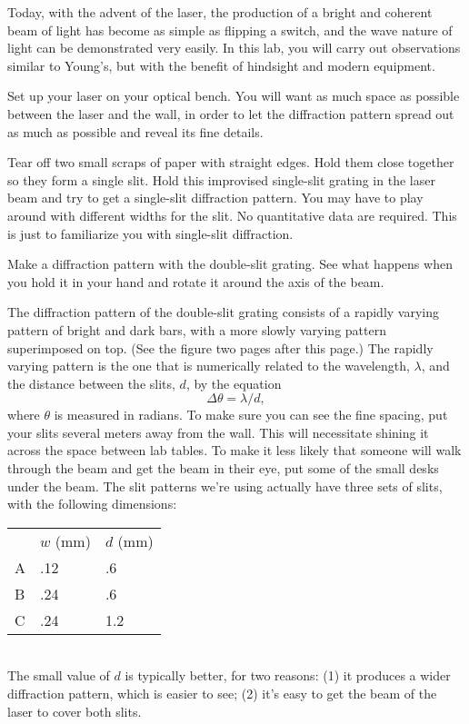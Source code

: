 Today, with the advent of the laser, the production of a
bright and coherent beam of light has become as simple as
flipping a switch, and the wave nature of light can be
demonstrated very easily. In this lab, you will carry out
observations similar to Young's, but with the benefit of
hindsight and modern equipment.

\observations




Set up your laser on your optical bench. You will want as
much space as possible between the laser and the wall, in
order to let the diffraction pattern spread out as much as
possible and reveal its fine details.

Tear off two small scraps of paper with straight edges. Hold
them close together so they form a single slit. Hold this
improvised single-slit grating in the laser beam and try to
get a single-slit diffraction pattern. You may have to play
around with different widths for the slit. No quantitative
data are required. This is just to familiarize you with
single-slit diffraction.

Make a diffraction pattern with the double-slit grating. See
what happens when you hold it in your hand and rotate it
around the axis of the beam.

The diffraction pattern of the double-slit grating consists
of a rapidly varying pattern of bright and dark bars, with a
more slowly varying pattern superimposed on top. (See the figure
two pages after this page.) The rapidly varying pattern is the one that is
numerically related to the wavelength, $\lambda $, and the
distance between the slits, $d$, by the equation
\begin{equation*}
         \Delta\theta =  \lambda /d  ,  
\end{equation*}
where $\theta $ is measured in radians. To make sure you can
see the fine spacing, put your slits several meters away
from the wall. This will necessitate shining it across the
space between lab tables. To make it less likely that
someone will walk through the beam and get the beam in their
eye, put some of the small desks under the beam.
The slit patterns we're using actually have three sets of
slits, with the following dimensions:\\
\begin{tabular}{lll}
    & $w$ (mm) & $d$ (mm) \\
A   & .12 & .6 \\
B   & .24 & .6 \\
C   & .24 & 1.2 
\end{tabular}\\
The small value of $d$ is typically better, for two reasons:
(1) it produces a wider diffraction pattern, which is easier
to see; (2) it's easy to get the beam of the laser to cover
both slits. 

